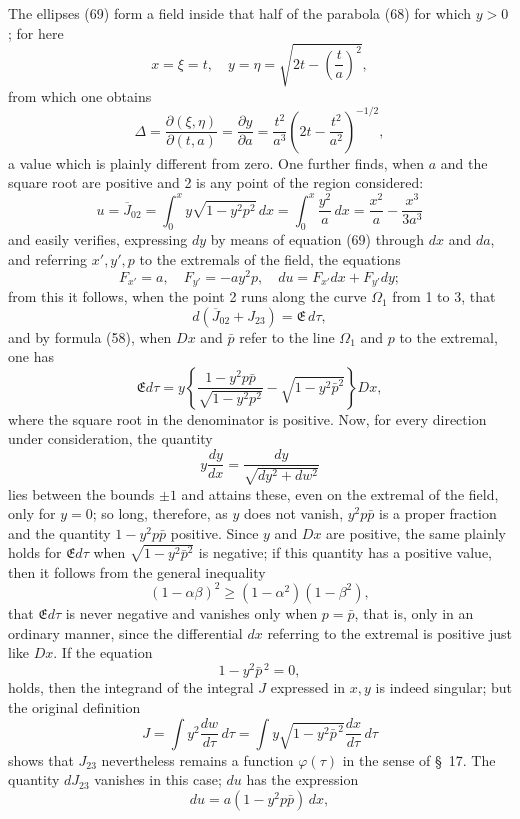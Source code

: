 \documentclass[11pt,a4paper,leqno]{article}
\begin{document}
The ellipses (69) form a field inside that half of the parabola (68) for which $y>0$; for here
\[
x=\xi=t,\quad
y=\eta=\sqrt{2t-\left(\frac{t}{a}\right)^2},
\]
from which one obtains
\[
\Delta=\frac{\partial(\xi,\eta)}{\partial(t,a)}
=\frac{\partial y}{\partial a}
=
\frac{t^2}{a^3}\left(2t-\frac{t^2}{a^2}\right)^{-1/2},
\]
a value which is plainly different from zero. One further finds, when $a$ and the square root are positive and 2 is any point of the region considered:
\begin{equation}\tag{71}
u=\overline{J}_{02}
=
\int_0^x y\sqrt{1-y^2p^2}\,dx
=
\int_0^x\frac{y^2}{a}\,dx
=
\frac{x^2}{a}-\frac{x^3}{3a^3}
\end{equation}
and easily verifies, expressing $dy$ by means of equation (69) through $dx$ and $da$, and referring $x',y',p$ to the extremals of the field, the equations
\[
F_{x'}=a,\quad F_{y'}=-ay^2p,\quad du=F_{x'}dx+F_{y'}dy;
\]
from this it follows, when the point 2 runs along the curve $\Omega_1$ from 1 to 3, that
\[
d(\overline{J}_{02}+J_{23})=\mathfrak{E}\,d\tau,
\]
and by formula (58), when $D x$ and $\bar{p}$ refer to the line $\Omega_1$ and $p$ to the extremal, one has
\[
\mathfrak{E}d\tau
=
y\left\{
\frac{1-y^2p\bar{p}}{\sqrt{1-y^2p^2}}
-
\sqrt{1-y^2\bar{p}^2}
\right\}D x,
\]
where the square root in the denominator is positive. Now, for every direction under consideration, the quantity
\[
y\frac{dy}{dx}
=
\frac{dy}{\sqrt{dy^2+dw^2}}
\]
lies between the bounds $\pm1$ and attains these, even on the extremal of the field, only for $y=0$; so long, therefore, as $y$ does not vanish, $y^2p\bar{p}$ is a proper fraction and the quantity $1-y^2p\bar{p}$ positive. Since $y$ and $D x$ are positive, the same plainly holds for $\mathfrak{E}d\tau$ when $\sqrt{1-y^2\bar{p}^2}$ is negative; if this quantity has a positive value, then it follows from the general inequality
\[
(1-\alpha\beta)^2\geq(1-\alpha^2)(1-\beta^2),
\]
that $\mathfrak{E}d\tau$ is never negative and vanishes only when $p=\bar{p}$, that is, only in an ordinary manner, since the differential $dx$ referring to the extremal is positive just like $D x$. If the equation
\[
1-y^2\bar{p}^{\,2}=0,
\]
holds, then the integrand of the integral $J$ expressed in $x,y$ is indeed singular; but the original definition
\[
J=\int y^2\frac{dw}{d\tau}\,d\tau
=
\int y\sqrt{1-y^2\bar{p}^{\,2}}\frac{dx}{d\tau}\,d\tau
\]
shows that $J_{23}$ nevertheless remains a function $\varphi(\tau)$ in the sense of \S~17. The quantity $dJ_{23}$ vanishes in this case; $du$ has the expression
\[
du=a(1-y^2p\bar{p})\,dx,
\]
\end{document}
